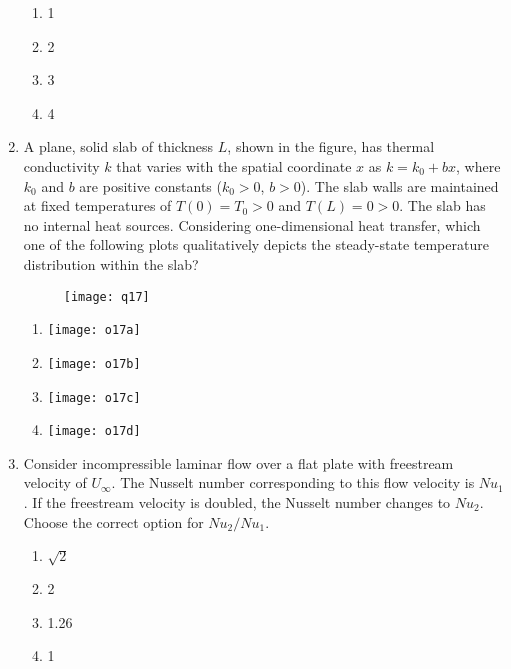 \documentclass[journal,11pt,onecolumn]{IEEEtran}
\begin{document}
\begin{enumerate}[resume]
          \begin{enumerate}
              \item 1
              \item 2
              \item 3
              \item 4
          \end{enumerate}

    \item A plane, solid slab of thickness $L$, shown in the figure, has thermal conductivity $k$ that varies with the spatial coordinate $x$ as $k = k_0 + bx$, where $k_0$ and $b$ are positive constants ($k_0 > 0$, $b > 0$). The slab walls are maintained at fixed temperatures of $T(0) = T_0 > 0$ and $T(L) = 0 > 0$. The slab has no internal heat sources. Considering one-dimensional heat transfer, which one of the following plots qualitatively depicts the steady-state temperature distribution within the slab?

          \begin{figure}[H]
              \centering
              \texttt{[image: q17]}
              \caption{}
              \label{fig:q17}
          \end{figure}

          \begin{enumerate}
              \item \texttt{[image: o17a]}
              \item \texttt{[image: o17b]}
              \item \texttt{[image: o17c]}
              \item \texttt{[image: o17d]}
          \end{enumerate}

    \item Consider incompressible laminar flow over a flat plate with freestream velocity of $U_\infty$. The Nusselt number corresponding to this flow velocity is $Nu_1$. If the freestream velocity is doubled, the Nusselt number changes to $Nu_2$. Choose the correct option for $Nu_2/Nu_1$.

          \begin{enumerate}
              \item $\sqrt{2}$
              \item 2
              \item 1.26
              \item 1
          \end{enumerate}


\end{enumerate}
\end{document}
